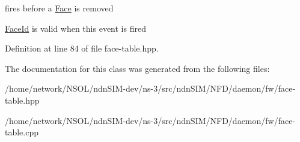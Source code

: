 fires before a \hyperlink{classnfd_1_1Face}{Face} is removed 

\hyperlink{classFaceId}{Face\+Id} is valid when this event is fired 

Definition at line 84 of file face-\/table.\+hpp.



The documentation for this class was generated from the following files\+:\begin{DoxyCompactItemize}
\item 
/home/network/\+N\+S\+O\+L/ndn\+S\+I\+M-\/dev/ns-\/3/src/ndn\+S\+I\+M/\+N\+F\+D/daemon/fw/face-\/table.\+hpp\item 
/home/network/\+N\+S\+O\+L/ndn\+S\+I\+M-\/dev/ns-\/3/src/ndn\+S\+I\+M/\+N\+F\+D/daemon/fw/face-\/table.\+cpp\end{DoxyCompactItemize}
